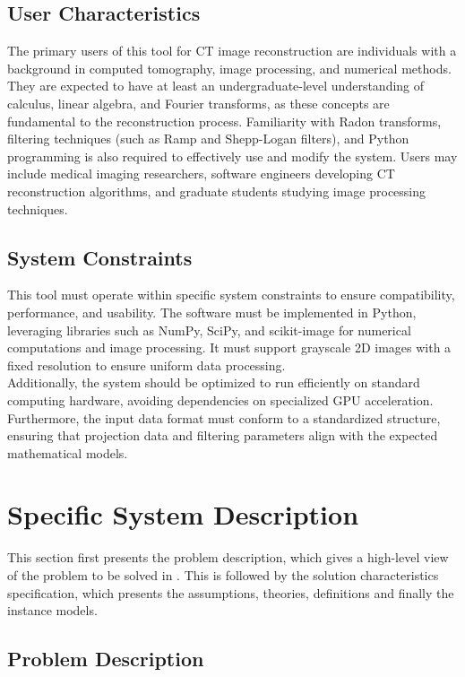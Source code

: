 \documentclass[12pt]{article}
\begin{document}
\subsection{User Characteristics} \label{SecUserCharacteristics} The primary
users of this tool for CT image reconstruction are individuals with a background
in computed tomography, image processing, and numerical methods. They are
expected to have at least an undergraduate-level understanding of calculus,
linear algebra, and Fourier transforms, as these concepts are fundamental to the
reconstruction process. Familiarity with Radon transforms, filtering techniques
(such as Ramp and Shepp-Logan filters), and Python programming is also required
to effectively use and modify the system. Users may include medical imaging
researchers, software engineers developing CT reconstruction algorithms, and
graduate students studying image processing techniques.

\subsection{System Constraints}
This tool must operate within specific system constraints to ensure
compatibility, performance, and usability. The software must be implemented in
Python, leveraging libraries such as NumPy, SciPy, and scikit-image for
numerical computations and image processing. It must support grayscale 2D images
with a fixed resolution to ensure uniform data
processing.\\

Additionally, the system should be optimized to run efficiently on
standard computing hardware, avoiding dependencies on specialized GPU
acceleration. Furthermore, the input data format must conform to a standardized
structure, ensuring that projection data and filtering parameters align with the
expected mathematical models.

\section{Specific System Description} \label{specific description} This section
first presents the problem description, which gives a high-level view of the
problem to be solved in \progname{}. This is followed by the solution
characteristics specification, which presents the assumptions, theories,
definitions and finally the instance models.

\subsection{Problem Description} \label{Sec_pd}
\end{document}
